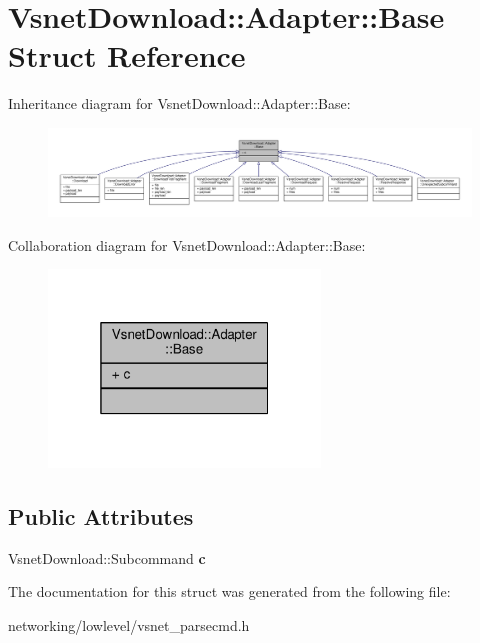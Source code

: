 \hypertarget{structVsnetDownload_1_1Adapter_1_1Base}{}\section{Vsnet\+Download\+:\+:Adapter\+:\+:Base Struct Reference}
\label{structVsnetDownload_1_1Adapter_1_1Base}


Inheritance diagram for Vsnet\+Download\+:\+:Adapter\+:\+:Base\+:
\nopagebreak
\begin{figure}[H]
\begin{center}
\leavevmode
\includegraphics[width=350pt]{dc/dd4/structVsnetDownload_1_1Adapter_1_1Base__inherit__graph}
\end{center}
\end{figure}


Collaboration diagram for Vsnet\+Download\+:\+:Adapter\+:\+:Base\+:
\nopagebreak
\begin{figure}[H]
\begin{center}
\leavevmode
\includegraphics[width=205pt]{d1/ddc/structVsnetDownload_1_1Adapter_1_1Base__coll__graph}
\end{center}
\end{figure}
\subsection*{Public Attributes}
\begin{DoxyCompactItemize}
\item 
Vsnet\+Download\+::\+Subcommand {\bfseries c}\hypertarget{structVsnetDownload_1_1Adapter_1_1Base_a1166da532fe346f0157d57f3457612eb}{}\label{structVsnetDownload_1_1Adapter_1_1Base_a1166da532fe346f0157d57f3457612eb}

\end{DoxyCompactItemize}


The documentation for this struct was generated from the following file\+:\begin{DoxyCompactItemize}
\item 
networking/lowlevel/vsnet\+\_\+parsecmd.\+h\end{DoxyCompactItemize}
